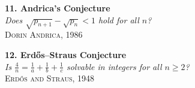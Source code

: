\begin{center}
\begin{tcolorbox}[
    colback=gray!2,
    colframe=gray!60,
    boxrule=0.4pt,
    width=\textwidth,
    arc=1pt,
    left=6pt,
    right=6pt,
    top=6pt,
    bottom=6pt,
    shadow={0mm}{-0.5mm}{0mm}{gray!40}
  ]
  \vspace{2em}

  \noindent\begin{minipage}{0.44\textwidth}
    \textbf{11. Andrica’s Conjecture}\\
    \emph{Does \(\sqrt{p_{n+1}} - \sqrt{p_n} < 1\) hold for all \(n\)?}\\
    \hfill\textsc{Dorin Andrica, 1986}
  \end{minipage}\hfill
  \begin{minipage}{0.44\textwidth}
    \textbf{12. Erdős–Straus Conjecture}\\
    \emph{Is \(\tfrac{4}{n} = \tfrac{1}{a} + \tfrac{1}{b} + \tfrac{1}{c}\) solvable in integers for all \(n\ge2\)?}\\
    \hfill\textsc{Erdős and Straus, 1948}
  \end{minipage}

  \end{tcolorbox}
\end{center}


\thispagestyle{empty}
\begin{figure}[p]
\centering
{}
\end{figure}